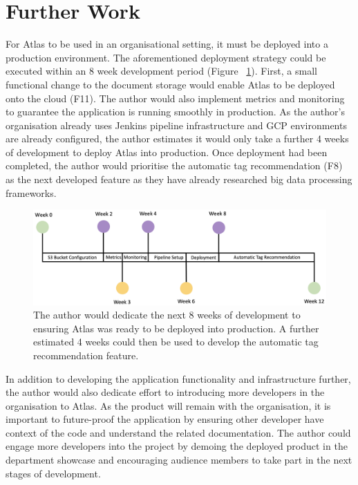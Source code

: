 \documentclass{article}
\begin{document}
\newpage
\section{Further Work}

For Atlas to be used in an organisational setting, it must be deployed into a production environment. The aforementioned deployment strategy could be executed within an 8 week development period (Figure ~\ref{fig:further-work}). First, a small functional change to the document storage would enable Atlas to be deployed onto the cloud (F11). The author would also implement metrics and monitoring to guarantee the application is running smoothly in production. As the author's organisation already uses Jenkins pipeline infrastructure and GCP environments are already configured, the author estimates it would only take a further 4 weeks of development to deploy Atlas into production. Once deployment had been completed, the author would prioritise the automatic tag recommendation (F8) as the next developed feature as they have already researched big data processing frameworks.

\begin{figure}[!htb]
  \centering
      \includegraphics[width=1\textwidth]{images/future-timeline.png}
  \caption{The author would dedicate the next 8 weeks of development to ensuring Atlas was ready to be deployed into production. A further estimated 4 weeks could then be used to develop the automatic tag recommendation feature.}
  \label{fig:further-work}
\end{figure}

In addition to developing the application functionality and infrastructure further, the author would also dedicate effort to introducing more developers in the organisation to Atlas. As the product will remain with the organisation, it is important to future-proof the application by ensuring other developer have context of the code and understand the related documentation. The author could engage more developers into the project by demoing the deployed product in the department showcase and encouraging audience members to take part in the next stages of development.
\end{document}
